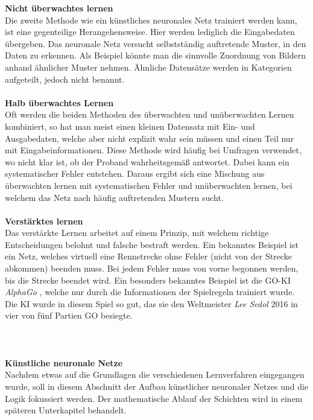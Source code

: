 \textbf{Nicht überwachtes lernen}\\
Die zweite Methode wie ein künstliches neuronales Netz trainiert werden kann, ist eine gegenteilige Herangehensweise. Hier werden lediglich die Eingabedaten übergeben. Das neuronale Netz versucht selbstständig auftretende Muster, in den Daten zu erkennen. Als Beispiel könnte man die sinnvolle Zuordnung von Bildern anhand ähnlicher Muster nehmen. Ähnliche Datensätze werden in Kategorien aufgeteilt, jedoch nicht benannt.\\\\
\textbf{Halb überwachtes Lernen}\\
Oft werden die beiden Methoden des überwachten und unüberwachten Lernen kombiniert, so hat man meist einen kleinen Datensatz mit Ein- und Ausgabedaten, welche aber nicht explizit wahr sein müssen und einen Teil nur mit Eingabeinformationen. Diese Methode wird häufig bei Umfragen verwendet, wo nicht klar ist, ob der Proband wahrheitsgemäß antwortet. Dabei kann ein systematischer Fehler entstehen. Daraus ergibt sich eine Mischung aus überwachten lernen mit systematischen Fehler und unüberwachten lernen, bei welchem das Netz nach häufig auftretenden Mustern sucht.\\\\
\textbf{Verstärktes lernen}\\ 
Das verstärkte Lernen arbeitet auf einem Prinzip, mit welchem richtige Entscheidungen belohnt und falsche bestraft werden. Ein bekanntes Beispiel ist ein Netz, welches virtuell eine Rennstrecke ohne Fehler (nicht von der Strecke abkommen) beenden muss. Bei jedem Fehler muss von vorne begonnen werden, bis die Strecke beendet wird. Ein besonders bekanntes Beispiel ist die GO-KI \textit{AlphaGo} \cite{Alpha2016GO}, welche nur durch die Informationen der Spielregeln trainiert wurde. Die KI wurde in diesem Spiel so gut, das sie den Weltmeister \textit{Lee Sedol} 2016 in vier von fünf Partien GO besiegte.\\\\\\\\
\textbf{Künstliche neuronale Netze}\\
Nachdem etwas auf die Grundlagen die verschiedenen Lernverfahren eingegangen wurde, soll in diesem Abschnitt der Aufbau künstlicher neuronaler Netzes und die Logik fokussiert werden. Der mathematische Ablauf der Schichten wird in einem späteren Unterkapitel behandelt.\\
